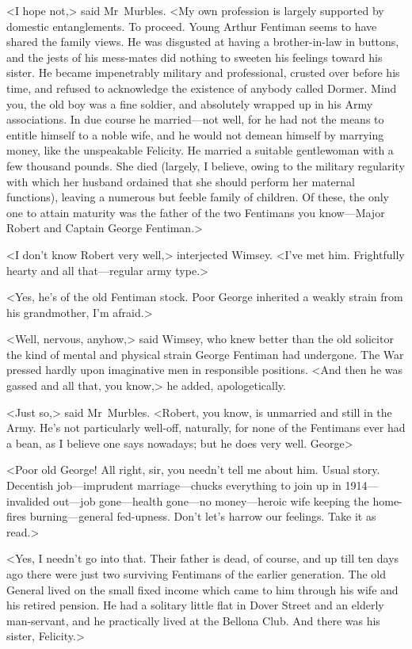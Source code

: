 <I hope not,> said Mr~Murbles. <My own profession is largely supported by domestic entanglements. To proceed. Young Arthur Fentiman seems to have shared the family views. He was disgusted at having a brother-in-law in buttons, and the jests of his mess-mates did nothing to sweeten his feelings toward his sister. He became impenetrably military and professional, crusted over before his time, and refused to acknowledge the existence of anybody called Dormer. Mind you, the old boy was a fine soldier, and absolutely wrapped up in his Army associations. In due course he married—not well, for he had not the means to entitle himself to a noble wife, and he would not demean himself by marrying money, like the unspeakable Felicity. He married a suitable gentlewoman with a few thousand pounds. She died (largely, I believe, owing to the military regularity with which her husband ordained that she should perform her maternal functions), leaving a numerous but feeble family of children. Of these, the only one to attain maturity was the father of the two Fentimans you know—Major Robert and Captain George Fentiman.>

<I don't know Robert very well,> interjected Wimsey. <I've met him. Frightfully hearty and all that—regular army type.>

<Yes, he's of the old Fentiman stock. Poor George inherited a weakly strain from his grandmother, I'm afraid.>

<Well, nervous, anyhow,> said Wimsey, who knew better than the old solicitor the kind of mental and physical strain George Fentiman had undergone. The War pressed hardly upon imaginative men in responsible positions. <And then he was gassed and all that, you know,> he added, apologetically.

<Just so,> said Mr~Murbles. <Robert, you know, is unmarried and still in the Army. He's not particularly well-off, naturally, for none of the Fentimans ever had a bean, as I believe one says nowadays; but he does very well. George\longdash>

<Poor old George! All right, sir, you needn't tell me about him. Usual story. Decentish job—imprudent marriage—chucks everything to join up in 1914—invalided out—job gone—health gone—no money—heroic wife keeping the home-fires burning—general fed-upness. Don't let's harrow our feelings. Take it as read.>

<Yes, I needn't go into that. Their father is dead, of course, and up till ten days ago there were just two surviving Fentimans of the earlier generation. The old General lived on the small fixed income which came to him through his wife and his retired pension. He had a solitary little flat in Dover Street and an elderly man-servant, and he practically lived at the Bellona Club. And there was his sister, Felicity.>


